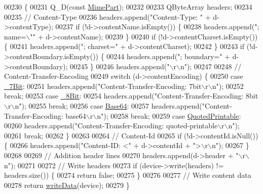 \begin{DoxyCode}
00230 \{
00231     Q\_D(\textcolor{keyword}{const} \hyperlink{class_simple_mail_1_1_mime_part}{MimePart});
00232 
00233     QByteArray headers;
00234 
00235     \textcolor{comment}{// Content-Type}
00236     headers.append(\textcolor{stringliteral}{"Content-Type: "} + d->contentType);
00237     \textcolor{keywordflow}{if} (!d->contentName.isEmpty()) \{
00238         headers.append(\textcolor{stringliteral}{"; name=\(\backslash\)""} + d->contentName);
00239     \}
00240     \textcolor{keywordflow}{if} (!d->contentCharset.isEmpty()) \{
00241         headers.append(\textcolor{stringliteral}{"; charset="} + d->contentCharset);
00242     \}
00243     \textcolor{keywordflow}{if} (!d->contentBoundary.isEmpty()) \{
00244         headers.append(\textcolor{stringliteral}{"; boundary="} + d->contentBoundary);
00245     \}
00246     headers.append(\textcolor{stringliteral}{"\(\backslash\)r\(\backslash\)n"});
00247 
00248     \textcolor{comment}{// Content-Transfer-Encoding}
00249     \textcolor{keywordflow}{switch} (d->contentEncoding) \{
00250     \textcolor{keywordflow}{case} \hyperlink{class_simple_mail_1_1_mime_part_ae67a2f5406958b95b18bf31a7bbeb5c9a93d518d86036ce6f149ffa646b52235a}{\_7Bit}:
00251         headers.append(\textcolor{stringliteral}{"Content-Transfer-Encoding: 7bit\(\backslash\)r\(\backslash\)n"});
00252         \textcolor{keywordflow}{break};
00253     \textcolor{keywordflow}{case} \hyperlink{class_simple_mail_1_1_mime_part_ae67a2f5406958b95b18bf31a7bbeb5c9a27c1574a6fe2fa936ae6cfe9654bb37f}{\_8Bit}:
00254         headers.append(\textcolor{stringliteral}{"Content-Transfer-Encoding: 8bit\(\backslash\)r\(\backslash\)n"});
00255         \textcolor{keywordflow}{break};
00256     \textcolor{keywordflow}{case} \hyperlink{class_simple_mail_1_1_mime_part_ae67a2f5406958b95b18bf31a7bbeb5c9ae644dc14ba856889814d2da9c995b91a}{Base64}:
00257         headers.append(\textcolor{stringliteral}{"Content-Transfer-Encoding: base64\(\backslash\)r\(\backslash\)n"});
00258         \textcolor{keywordflow}{break};
00259     \textcolor{keywordflow}{case} \hyperlink{class_simple_mail_1_1_mime_part_ae67a2f5406958b95b18bf31a7bbeb5c9a29b5533d69a04cfef2c3ff6538c44db0}{QuotedPrintable}:
00260         headers.append(\textcolor{stringliteral}{"Content-Transfer-Encoding: quoted-printable\(\backslash\)r\(\backslash\)n"});
00261         \textcolor{keywordflow}{break};
00262     \}
00263 
00264     \textcolor{comment}{// Content-Id}
00265     \textcolor{keywordflow}{if} (!d->contentId.isNull()) \{
00266         headers.append(\textcolor{stringliteral}{"Content-ID: <"} + d->contentId + \textcolor{stringliteral}{">\(\backslash\)r\(\backslash\)n"});
00267     \}
00268 
00269     \textcolor{comment}{// Addition header lines}
00270     headers.append(d->header + \textcolor{stringliteral}{"\(\backslash\)r\(\backslash\)n"});
00271 
00272     \textcolor{comment}{// Write headers}
00273     \textcolor{keywordflow}{if} (device->write(headers) != headers.size()) \{
00274         \textcolor{keywordflow}{return} \textcolor{keyword}{false};
00275     \}
00276 
00277     \textcolor{comment}{// Write content data}
00278     \textcolor{keywordflow}{return} \hyperlink{class_simple_mail_1_1_mime_part_ab8b85a3cf47e6bd8d2051dfa5c56c36a}{writeData}(device);
00279 \}
\end{DoxyCode}
